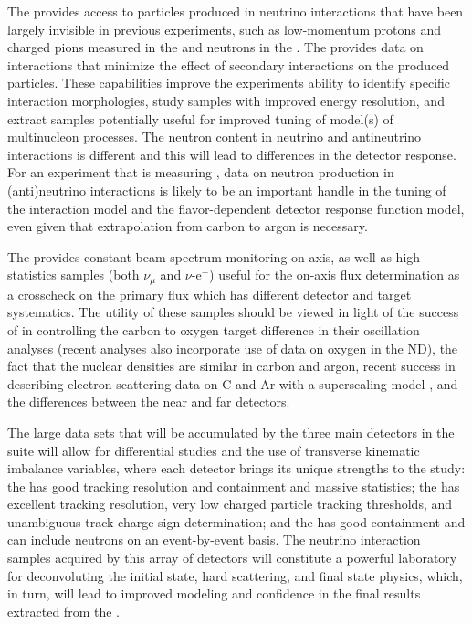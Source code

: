 The    provides access to particles produced in neutrino interactions that have been largely invisible in previous experiments, such as low-momentum protons and charged pions measured in the  and neutrons in the . The  provides data on interactions that minimize the effect of secondary interactions on the produced particles.  These capabilities improve the experiments ability to identify specific interaction morphologies, study samples with improved energy resolution, and extract samples potentially useful for improved tuning of model(s) of multinucleon processes. The neutron content in neutrino and antineutrino interactions is different and this will lead to differences in the detector response. For an experiment that is measuring , data on neutron production in (anti)neutrino interactions is likely to be an important handle in the tuning of the interaction model and the flavor-dependent detector response function model, even %
given that extrapolation from carbon to argon is necessary.  

The  provides constant beam spectrum monitoring on axis, as well as high statistics samples (both $\nu_{\mu}$  and $\nu$-e$^{-}$) useful for the on-axis flux determination as a crosscheck on the primary flux which has different detector and target systematics.  The utility of these samples should be viewed in light of the success of  in controlling the carbon to oxygen target difference in their oscillation analyses (recent analyses also incorporate use of data on oxygen in the ND), the fact that the nuclear densities are similar in carbon and argon, recent success in describing electron scattering data on C and Ar with a superscaling model \cite{Barbaro:2019vsr}, and the differences between the near and far  detectors.

The large data sets that will be accumulated by the three main detectors in the   suite will allow for differential studies and the use of transverse kinematic imbalance variables, where each detector brings its unique strengths to the study: the  has good tracking resolution and containment and massive statistics; the  has excellent tracking resolution, very low charged particle tracking thresholds, and unambiguous track charge sign determination; and the  has good containment and can include neutrons on an event-by-event basis. The neutrino interaction samples acquired by this array of detectors will constitute a powerful laboratory for deconvoluting the initial state, hard scattering, and final state physics, which, in turn, will lead to improved modeling and confidence in the final results extracted from the  .  




